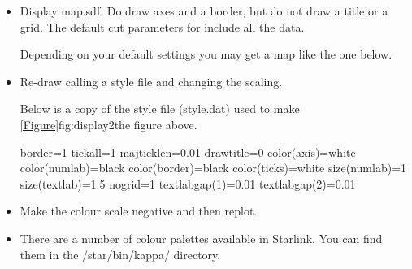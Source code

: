 \documentclass[11pt,oneside,chapters]{starlink}
\begin{document}
\begin{itemize}
\item Display map.sdf. Do draw axes and a border, but do not draw a
title or a grid. The default cut parameters for 
include all the data.
\begin{terminalv}
\end{terminalv}
Depending on your default settings you may get a map like the one below.


\item Re-draw calling a style file and changing the scaling.
\begin{terminalv}
\end{terminalv}


Below is a copy of the style file (style.dat) used to make
\cref{Figure}{fig:display2}{the figure above}.

\begin{terminalv}
border=1
tickall=1
majticklen=0.01
drawtitle=0
color(axis)=white
color(numlab)=black
color(border)=black
color(ticks)=white
size(numlab)=1
size(textlab)=1.5
nogrid=1
textlabgap(1)=0.01
textlabgap(2)=0.01
\end{terminalv}

\item Make the colour scale negative and then replot.
\begin{terminalv}
\end{terminalv}


\item There are a number of colour palettes available in Starlink. You
can find them in the /star/bin/kappa/ directory.
\begin{terminalv}
\end{terminalv}


\end{itemize}
\end{document}
